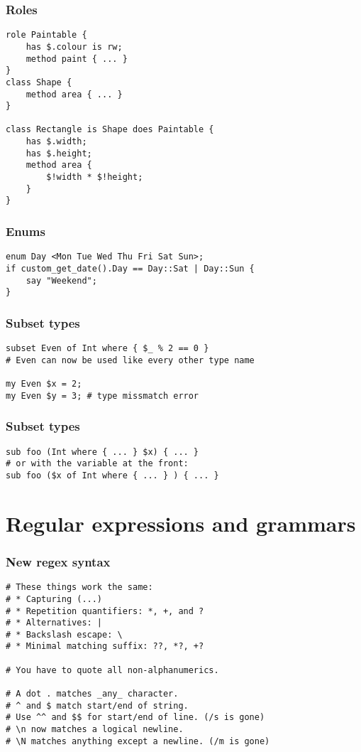\documentclass{beamer}
\begin{document}
\begin{frame}[fragile]
\frametitle{Roles}
\begin{verbatim}
role Paintable {
    has $.colour is rw;
    method paint { ... }
}
class Shape {
    method area { ... }
}

class Rectangle is Shape does Paintable {
    has $.width;
    has $.height;
    method area {
        $!width * $!height;
    }
}
\end{verbatim}
\end{frame}


\begin{frame}[fragile]
\frametitle{Enums}
\begin{verbatim}
enum Day <Mon Tue Wed Thu Fri Sat Sun>;
if custom_get_date().Day == Day::Sat | Day::Sun {
    say "Weekend";
}
\end{verbatim}
\end{frame}

\begin{frame}[fragile]
\frametitle{Subset types}
\begin{verbatim}
subset Even of Int where { $_ % 2 == 0 }
# Even can now be used like every other type name

my Even $x = 2;
my Even $y = 3; # type missmatch error
\end{verbatim}
\end{frame}

\begin{frame}[fragile]
\frametitle{Subset types}
\begin{verbatim}
sub foo (Int where { ... } $x) { ... }
# or with the variable at the front:
sub foo ($x of Int where { ... } ) { ... }
\end{verbatim}
\end{frame}

\section{Regular expressions and grammars}

\begin{frame}[fragile]
\frametitle{New regex syntax}
\begin{verbatim}
# These things work the same:
# * Capturing (...)
# * Repetition quantifiers: *, +, and ?
# * Alternatives: |
# * Backslash escape: \
# * Minimal matching suffix: ??, *?, +? 

# You have to quote all non-alphanumerics.

# A dot . matches _any_ character.
# ^ and $ match start/end of string.
# Use ^^ and $$ for start/end of line. (/s is gone)
# \n now matches a logical newline.
# \N matches anything except a newline. (/m is gone)
\end{verbatim}
\end{frame}
\end{document}
